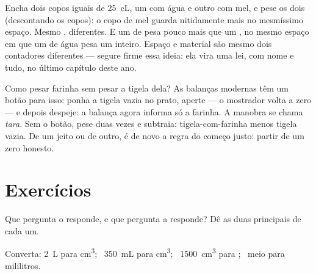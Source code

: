 \begin{example}\label{ex:g6:mass-and-volume:different}
Encha dois copos iguais de \qty{25}{cL}, um com água e outro com mel,
e pese os dois (descontando os copos): o copo de mel guarda
nitidamente mais  no mesmíssimo espaço. Mesmo , 
diferentes. E um  de  pesa pouco mais que um , no mesmo
espaço em que um  de água pesa um  inteiro. Espaço e
material são mesmo dois contadores diferentes --- segure firme essa
ideia: ela vira uma lei, com nome e tudo, no último capítulo deste
ano.
\end{example}

\begin{remark}\label{rem:g6:mass-and-volume:tare}
Como pesar farinha sem pesar a tigela dela? As balanças modernas têm
um botão para isso: ponha a tigela vazia no prato, aperte --- o
mostrador volta a zero --- e depois despeje: a balança agora informa
só a farinha. A manobra se chama \emph{tara}. Sem o botão, pese duas
vezes e subtraia: tigela-com-farinha menos tigela vazia. De um jeito
ou de outro, é de novo a regra do começo justo: partir de um zero
honesto.
\end{remark}

\section{Exercícios}

\begin{exercise}[$\star$]\label{exo:g6:mass-and-volume:1}
Que pergunta o  responde, e que pergunta a  responde? Dê
as duas principais  de cada um.
\end{exercise}

\begin{exercise}[$\star$]\label{exo:g6:mass-and-volume:2}
Converta: \qty{2}{L} para \unit{cm^3}; \ \qty{350}{mL} para
\unit{cm^3}; \ \qty{1500}{cm^3} para ; \ meio  para
mililitros.
\end{exercise}


